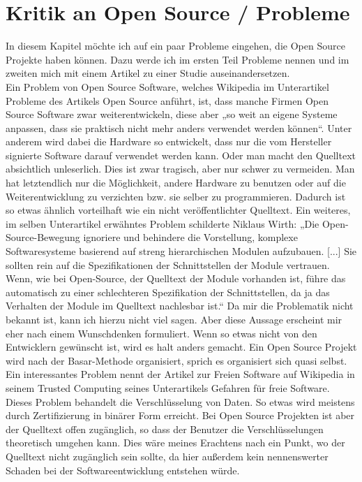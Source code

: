 \documentclass[a4paper,12pt]{article}
\begin{document}
\section{Kritik an Open Source / Probleme}
In diesem Kapitel möchte ich auf ein paar Probleme eingehen, die Open Source Projekte haben können. Dazu werde ich im ersten Teil Probleme nennen und im zweiten mich mit einem Artikel zu einer Studie auseinandersetzen.\\
Ein Problem von Open Source Software, welches Wikipedia im Unterartikel Probleme des Artikels Open Source anführt, ist, dass manche Firmen Open Source Software zwar weiterentwickeln, diese aber „so weit an eigene Systeme anpassen, dass sie praktisch nicht mehr anders verwendet werden können“. Unter anderem wird dabei die Hardware so entwickelt, dass nur die vom Hersteller signierte Software darauf verwendet werden kann. Oder man macht den Quelltext absichtlich unleserlich. Dies ist zwar tragisch, aber nur schwer zu vermeiden. Man hat letztendlich nur die Möglichkeit, andere Hardware zu benutzen oder auf die Weiterentwicklung zu verzichten bzw. sie selber zu programmieren. Dadurch ist so etwas ähnlich vorteilhaft wie ein nicht veröffentlichter Quelltext. Ein weiteres, im selben Unterartikel erwähntes Problem schilderte Niklaus Wirth: „Die Open-Source-Bewegung ignoriere und behindere die Vorstellung, komplexe Softwaresysteme basierend auf streng hierarchischen Modulen aufzubauen. [...] Sie sollten rein auf die Spezifikationen der Schnittstellen der Module vertrauen. Wenn, wie bei Open-Source, der Quelltext der Module vorhanden ist, führe das automatisch zu einer schlechteren Spezifikation der Schnittstellen, da ja das Verhalten der Module im Quelltext nachlesbar ist.“ Da mir die Problematik nicht bekannt ist, kann ich hierzu nicht viel sagen. Aber diese Aussage erscheint mir eher nach einem Wunschdenken formuliert. Wenn so etwas nicht von den Entwicklern gewünscht ist, wird es halt anders gemacht. Ein Open Source Projekt wird nach der Basar-Methode organisiert, sprich es organisiert sich quasi selbst.\\ Ein interessantes Problem nennt der Artikel zur Freien Software auf Wikipedia in seinem Trusted Computing seines Unterartikels Gefahren für freie Software. Dieses Problem behandelt die Verschlüsselung von Daten. So etwas wird meistens durch Zertifizierung in binärer Form erreicht. Bei Open Source Projekten ist aber der Quelltext offen zugänglich, so dass der Benutzer die Verschlüsselungen theoretisch umgehen kann. Dies wäre meines Erachtens nach ein Punkt, wo der Quelltext nicht zugänglich sein sollte, da hier außerdem kein nennenswerter Schaden bei der Softwareentwicklung entstehen würde.\\
\end{document}

